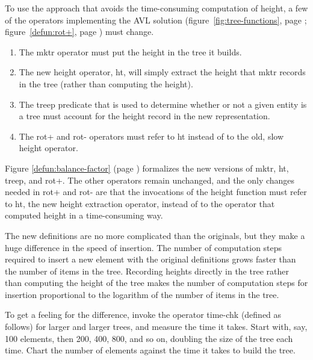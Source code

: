 To use the approach that avoids
the time-consuming computation of height,
a few of the operators implementing the AVL solution
(figure~\ref{fig:tree-functions}, page \pageref{fig:tree-functions};
figure~\ref{defun:rot+}, page \pageref{defun:rot+})
must change.

\begin{enumerate}
\item The \textsf{mktr} operator must put the height in the tree it builds.
\item The new height operator, \textsf{ht},
      will simply extract the height that \textsf{mktr}
      records in the tree (rather than computing the height).
\item The \textsf{treep} predicate that is used to determine whether or not
      a given entity is a tree must account for the
      height record in the new representation.
\item The \textsf{rot}+ and \textsf{rot-} operators must refer to \textsf{ht}
      instead of to the old, slow \textsf{height} operator.
\end{enumerate}

Figure \ref{defun:balance-factor} (page \pageref{defun:balance-factor})
formalizes the new versions of
\textsf{mktr}, \textsf{ht}, \textsf{treep}, and \textsf{rot}+.
The other operators remain unchanged,
and the only changes needed in \textsf{rot}+ and \textsf{rot-}
are that the invocations of the height function
must refer to \textsf{ht},
the new height extraction operator,
instead of to the operator that computed height
in a time-consuming way.

The new definitions are no more complicated than the originals,
but they make a huge difference in the speed of insertion.
The number of computation steps required to insert a new
element with the original definitions grows faster than
the number of items in the tree.
Recording heights directly in the tree
rather than computing the height of the tree
makes the number of computation
steps for insertion proportional to the logarithm of
the number of items in the tree.

To get a feeling for the difference, invoke the operator time-chk
(defined as follows) for larger and larger trees,
and measure the time it takes.
Start with, say, 100 elements, then 200, 400, 800, and
so on, doubling the size of the tree each time.
Chart the number of elements against
the time it takes to build the tree.

